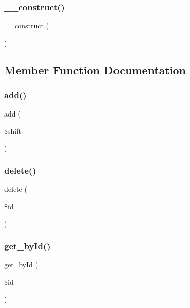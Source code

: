 \subsubsection{\texorpdfstring{\+\_\+\+\_\+construct()}{\_\_construct()}}
{\footnotesize\ttfamily \+\_\+\+\_\+construct (\begin{DoxyParamCaption}{ }\end{DoxyParamCaption})}



\subsection{Member Function Documentation}
\mbox{\label{class_shiften___model_a3fc76f85c3f3f387825bd98a099eb973}} 
\subsubsection{\texorpdfstring{add()}{add()}}
{\footnotesize\ttfamily add (\begin{DoxyParamCaption}\item[{}]{\$shift }\end{DoxyParamCaption})}

\mbox{\label{class_shiften___model_a2f8258add505482d7f00ea26493a5723}} 
\subsubsection{\texorpdfstring{delete()}{delete()}}
{\footnotesize\ttfamily delete (\begin{DoxyParamCaption}\item[{}]{\$id }\end{DoxyParamCaption})}

\mbox{\label{class_shiften___model_a98d28a4d9a29d40c5a8aa0176f19a919}} 
\subsubsection{\texorpdfstring{get\+\_\+by\+Id()}{get\_byId()}}
{\footnotesize\ttfamily get\+\_\+by\+Id (\begin{DoxyParamCaption}\item[{}]{\$id }\end{DoxyParamCaption})}

